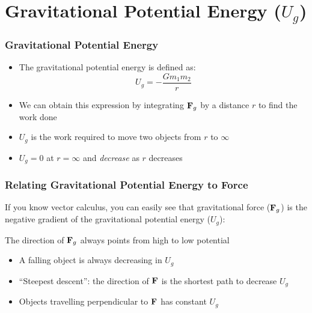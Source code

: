 \documentclass[12pt,compress,aspectratio=169]{beamer}
\newcommand{\mb}[1]{\ensuremath\mathbf{#1}}
\begin{document}
\section[$U_g$]{Gravitational Potential Energy ($U_g$)}


\begin{frame}
  \frametitle{Gravitational Potential Energy}

  \begin{itemize}
  \item The gravitational potential energy is defined as:
    {\Large
      \begin{displaymath}
        \boxed{U_g=-\frac{Gm_1m_2}{r}}
    \end{displaymath}
    }
  \item We can obtain this expression by integrating $\mb{F}_g$ by a distance
    $r$ to find the work done
  \item $U_g$ is the work required to move two objects from $r$ to $\infty$
  \item $U_g=0$ at $r=\infty$ and \emph{decrease} as $r$ decreases
  \end{itemize}
\end{frame}


\begin{frame}
  \frametitle{Relating Gravitational Potential Energy to Force}

  If you know vector calculus, you can easily see that gravitational
  force ($\mb{F}_g$) is the negative gradient of the gravitational potential
  energy ($U_g$):
  
  \vspace{-0.1in}{\Large
    \begin{displaymath}
      \mb{F}_g=-\nabla U_g=
      -\frac{\partial U_g}{\partial r}\hat{\mb{r}}
    \end{displaymath}
  }

  The direction of $\mb{F}_g$ always points from high to low potential
  \begin{itemize}
  \item A falling object is always decreasing in $U_g$
  \item ``Steepest descent'': the direction of $\mb{F}$ is the shortest path
    to decrease $U_g$ 
  \item Objects travelling perpendicular to $\mb{F}$ has constant $U_g$
  \end{itemize}
\end{frame}
\end{document}
